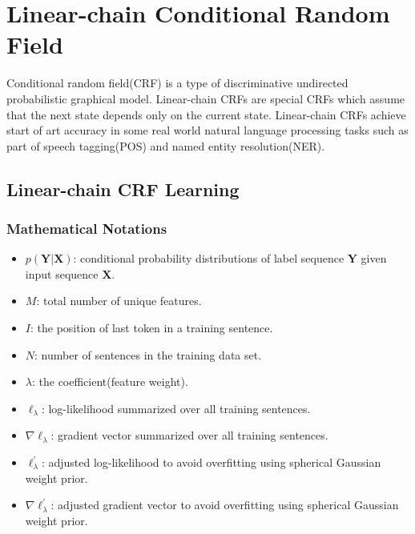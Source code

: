 
\chapter[Linear-chain Conditional Random Field]{Linear-chain Conditional Random Field}
Conditional random field(CRF) \cite{DBLP:conf/icml/LaffertyMP01} is a type of discriminative undirected probabilistic graphical model.
Linear-chain CRFs are special CRFs which assume that the next state depends only on the current state. 
Linear-chain CRFs achieve start of art accuracy in some real world natural language processing tasks such
as part of speech tagging(POS) and named entity resolution(NER).

\section{Linear-chain CRF Learning}

\subsection{Mathematical Notations}
\begin{itemize}
\item $p(\boldsymbol Y | \boldsymbol X)$: conditional probability distributions of label sequence $\boldsymbol Y$ given input sequence $\boldsymbol X$.
\item $M$: total number of unique features.
\item $I$: the position of last token in a training sentence.
\item $N$: number of sentences in the training data set.
\item $\lambda$: the coefficient(feature weight).
\item $\ell_{\lambda}$: log-likelihood summarized over all training sentences.
\item $\nabla \ell_{\lambda}$: gradient vector summarized over all training sentences.
\item $\ell_{\lambda}^\prime$: adjusted log-likelihood to avoid overfitting using spherical Gaussian weight prior.
\item $\nabla \ell_{\lambda}^\prime$: adjusted gradient vector to avoid overfitting using spherical Gaussian weight prior.

\end{itemize}


